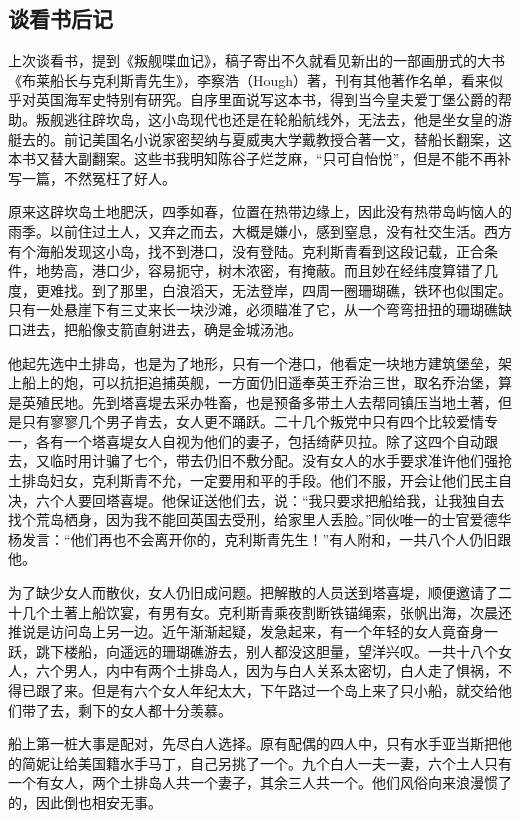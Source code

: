 \subsection{谈看书后记}


\par 上次谈看书，提到《叛舰喋血记》，稿子寄出不久就看见新出的一部画册式的大书《布莱船长与克利斯青先生》，李察浩（Hough）著，刊有其他著作名单，看来似乎对英国海军史特别有研究。自序里面说写这本书，得到当今皇夫爱丁堡公爵的帮助。叛舰逃往辟坎岛，这小岛现代也还是在轮船航线外，无法去，他是坐女皇的游艇去的。前记美国名小说家密契纳与夏威夷大学戴教授合著一文，替船长翻案，这本书又替大副翻案。这些书我明知陈谷子烂芝麻，“只可自怡悦”，但是不能不再补写一篇，不然冤枉了好人。
\par 原来这辟坎岛土地肥沃，四季如春，位置在热带边缘上，因此没有热带岛屿恼人的雨季。以前住过土人，又弃之而去，大概是嫌小，感到窒息，没有社交生活。西方有个海船发现这小岛，找不到港口，没有登陆。克利斯青看到这段记载，正合条件，地势高，港口少，容易扼守，树木浓密，有掩蔽。而且妙在经纬度算错了几度，更难找。到了那里，白浪滔天，无法登岸，四周一圈珊瑚礁，铁环也似围定。只有一处悬崖下有三丈来长一块沙滩，必须瞄准了它，从一个弯弯扭扭的珊瑚礁缺口进去，把船像支箭直射进去，确是金城汤池。
\par 他起先选中土排岛，也是为了地形，只有一个港口，他看定一块地方建筑堡垒，架上船上的炮，可以抗拒追捕英舰，一方面仍旧遥奉英王乔治三世，取名乔治堡，算是英殖民地。先到塔喜堤去采办牲畜，也是预备多带土人去帮同镇压当地土著，但是只有寥寥几个男子肯去，女人更不踊跃。二十几个叛党中只有四个比较爱情专一，各有一个塔喜堤女人自视为他们的妻子，包括绮萨贝拉。除了这四个自动跟去，又临时用计骗了七个，带去仍旧不敷分配。没有女人的水手要求准许他们强抢土排岛妇女，克利斯青不允，一定要用和平的手段。他们不服，开会让他们民主自决，六个人要回塔喜堤。他保证送他们去，说：“我只要求把船给我，让我独自去找个荒岛栖身，因为我不能回英国去受刑，给家里人丢脸。”同伙唯一的士官爱德华杨发言：“他们再也不会离开你的，克利斯青先生！”有人附和，一共八个人仍旧跟他。
\par 为了缺少女人而散伙，女人仍旧成问题。把解散的人员送到塔喜堤，顺便邀请了二十几个土著上船饮宴，有男有女。克利斯青乘夜割断铁锚绳索，张帆出海，次晨还推说是访问岛上另一边。近午渐渐起疑，发急起来，有一个年轻的女人竟奋身一跃，跳下楼船，向遥远的珊瑚礁游去，别人都没这胆量，望洋兴叹。一共十八个女人，六个男人，内中有两个土排岛人，因为与白人关系太密切，白人走了惧祸，不得已跟了来。但是有六个女人年纪太大，下午路过一个岛上来了只小船，就交给他们带了去，剩下的女人都十分羡慕。
\par 船上第一桩大事是配对，先尽白人选择。原有配偶的四人中，只有水手亚当斯把他的简妮让给美国籍水手马丁，自己另挑了一个。九个白人一夫一妻，六个土人只有一个有女人，两个土排岛人共一个妻子，其余三人共一个。他们风俗向来浪漫惯了的，因此倒也相安无事。
